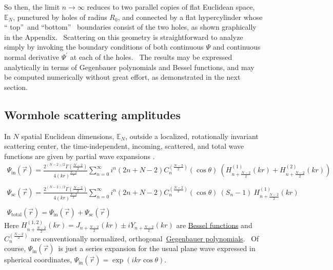 \documentclass{article}%
\begin{document}
So then, the limit $n\rightarrow\infty$ reduces to two parallel copies of flat
Euclidean space, $\mathbb{E}_{N}$, punctured by holes of radius $R_{0}$, and
connected by a flat hypercylinder whose \textquotedblleft
top\textquotedblright\ and \textquotedblleft bottom\textquotedblright%
\ boundaries consist of the two holes, as shown graphically in the Appendix.
\ Scattering on this geometry is straightforward to analyze simply by invoking
the boundary conditions of both continuous $\Psi$ and continuous normal
derivative $\Psi^{\prime}$ at each of the holes. \ The results may be
expressed analytically in terms of Gegenbauer polynomials and Bessel
functions, and may be computed numerically without great effort, as
demonstrated in the next section.

\newpage

\subsection{Wormhole scattering amplitudes}

In $N$ spatial Euclidean dimensions, $\mathbb{E}_{N}$, outside a localized,
rotationally invariant scattering center, the time-independent, incoming,
scattered, and total wave functions are given by partial wave expansions
\cite{Sommerfeld}.%
\begin{gather}
\Psi_{\text{in}}\left(  \overrightarrow{r}\right)  =\frac{2^{\left(
N-2\right)  /2}\Gamma\left(  \frac{N-2}{2}\right)  }{4\left(  kr\right)
^{\frac{N-2}{2}}}\sum_{n=0}^{\infty}i^{n}\left(  2n+N-2\right)  C_{n}^{\left(
\frac{N-2}{2}\right)  }\left(  \cos\theta\right)  ~\left(  H_{n+\frac{N-2}{2}%
}^{\left(  1\right)  }\left(  kr\right)  +H_{n+\frac{N-2}{2}}^{\left(
2\right)  }\left(  kr\right)  \right) \\
\nonumber\\
\Psi_{\text{sc}}\left(  \overrightarrow{r}\right)  =\frac{2^{\left(
N-2\right)  /2}\Gamma\left(  \frac{N-2}{2}\right)  }{4\left(  kr\right)
^{\frac{N-2}{2}}}\sum_{n=0}^{\infty}i^{n}\left(  2n+N-2\right)  C_{n}^{\left(
\frac{N-2}{2}\right)  }\left(  \cos\theta\right)  ~\left(  S_{n}-1\right)
~H_{n+\frac{N-2}{2}}^{\left(  1\right)  }\left(  kr\right) \\
\nonumber\\
\Psi_{\text{total}}\left(  \overrightarrow{r}\right)  =\Psi_{\text{in}}\left(
\overrightarrow{r}\right)  +\Psi_{\text{sc}}\left(  \overrightarrow{r}\right)
\end{gather}
Here $H_{n+\frac{N-2}{2}}^{\left(  1,2\right)  }\left(  kr\right)
=J_{n+\frac{N-2}{2}}\left(  kr\right)  \pm iY_{n+\frac{N-2}{2}}\left(
kr\right)  $ are \href{https://en.wikipedia.org/wiki/Bessel_function}{Bessel
functions} and $C_{n}^{\left(  \frac{N-2}{2}\right)  }$ are conventionally
normalized,
orthogonal\ \href{https://en.wikipedia.org/wiki/Gegenbauer_polynomials}{Gegenbauer
polynomials}. \ Of course, $\Psi_{\text{in}}\left(  \overrightarrow{r}\right)
$\ is just a series expansion for the usual plane wave expressed in spherical
coordinates, $\Psi_{\text{in}}\left(  \overrightarrow{r}\right)  =\exp\left(
ikr\cos\theta\right)  $.
\end{document}

